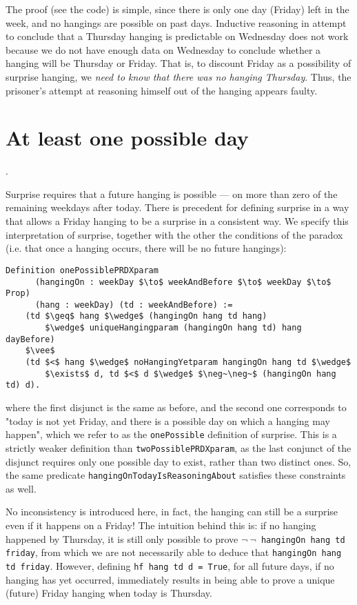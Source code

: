 \documentclass[runningheads]{llncs}
\begin{document}
The proof (see the code) is simple, since there is only one day (Friday) left in the week,
and no hangings are possible on past days.
Inductive reasoning in attempt to conclude that a Thursday hanging is
predictable on Wednesday does not work because we do not have enough data on Wednesday
to conclude whether a hanging will be Thursday or Friday. That is, to discount Friday
as a possibility of surprise hanging, we \emph{need to know that there was no
hanging Thursday}. Thus, the prisoner's attempt at reasoning himself out
of the hanging appears faulty.

\section{At least one possible day}.
\label{sec:one}

Surprise requires that a future hanging is possible --- on more than zero
of the remaining weekdays after today. There is precedent \cite{fourpossible}
for defining surprise
in a way that allows a Friday hanging to be a surprise in a consistent way.
We specify this interpretation of surprise, together with the other the conditions
of the paradox (i.e. that once a hanging occurs, there will be no future hangings):

\begin{lstlisting}[mathescape=true]
  Definition onePossiblePRDXparam
      (hangingOn : weekDay $\to$ weekAndBefore $\to$ weekDay $\to$ Prop)
      (hang : weekDay) (td : weekAndBefore) :=
    (td $\geq$ hang $\wedge$ (hangingOn hang td hang)
        $\wedge$ uniqueHangingparam (hangingOn hang td) hang dayBefore)
    $\vee$
    (td $<$ hang $\wedge$ noHangingYetparam hangingOn hang td $\wedge$
        $\exists$ d, td $<$ d $\wedge$ $\neg~\neg~$ (hangingOn hang td) d).
\end{lstlisting}

where the first disjunct is the same as before, and
the second one corresponds to "today is not
  yet Friday, and there is a possible day on which a hanging may happen", which
  we refer to as the {\tt onePossible} definition of surprise. This is a strictly
weaker definition than {\tt twoPossiblePRDXparam}, as the last conjunct of the
disjunct requires only one possible day to exist, rather than two distinct ones.
So, the same predicate {\tt hangingOnTodayIsReasoningAbout} satisfies these
constraints as well.

No inconsistency is introduced here, in fact, the hanging can still be a surprise even if it
happens on a Friday! The intuition behind this is: if no hanging happened by
Thursday, it is still only possible to prove {\tt $\neg~\neg$~hangingOn hang td friday},
from which we are not necessarily able to deduce that {\tt hangingOn hang td friday}.
However, defining {\tt hf hang td d = True}, for all future days, if no hanging has yet occurred,
immediately results in being able to prove a unique (future) Friday hanging when today is Thursday.
\end{document}
